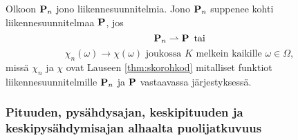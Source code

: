 \documentclass[12pt,oneside,a4paper]{amsbook} %
\begin{document}
\begin{definition}
    Olkoon $\P_n$ jono liikennesuunnitelmia. Jono $\P_n$ suppenee kohti liikennesuunnitelmaa $\P$, jos 
    $$\P_n \rightharpoonup \P \, \text{ tai}$$
    $$ \chi_n (\omega) \to  \chi (\omega) \text{ joukossa } K \text{ melkein kaikille } \omega
    \in \Omega,$$
    missä $ \chi_n$ ja $ \chi$ ovat Lauseen \ref{thm:skorohkod} mitalliset funktiot liikennesuunnitelmille $\P_n$ ja $\P$ vastaavassa järjestyksessä.
\end{definition}

\subsubsection{Pituuden, pysähdysajan, keskipituuden ja keskipysähdymisajan alhaalta puolijatkuvuus}
\end{document}
